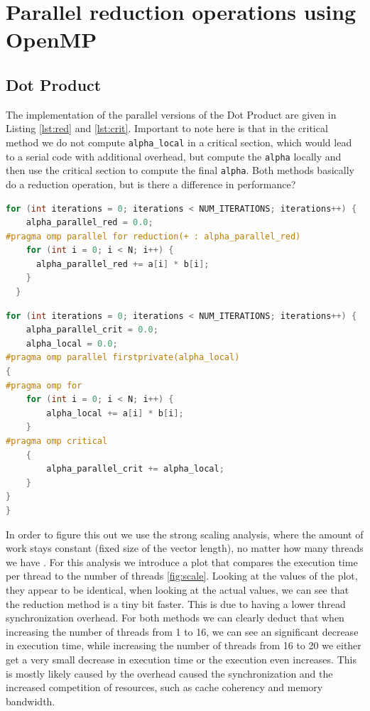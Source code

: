 \section{Parallel reduction operations using OpenMP}
\subsection{Dot Product}
The implementation of the parallel versions of the Dot Product are given in Listing \ref{lst:red} and \ref{lst:crit}.
Important to note here is that in the critical method we do not compute \texttt{alpha\_local} in a critical section, which would lead to a serial code with additional overhead, but compute the \texttt{alpha} locally and then use the critical section to compute the final \texttt{alpha}. Both methods basically do a reduction operation, but is there a difference in performance? \newline
\begin{minipage}{.48\textwidth}
\begin{lstlisting}[language=C++, caption=Reduction Method, label=lst:red]
  for (int iterations = 0; iterations < NUM_ITERATIONS; iterations++) {
    alpha_parallel_red = 0.0;
#pragma omp parallel for reduction(+ : alpha_parallel_red)
    for (int i = 0; i < N; i++) {
      alpha_parallel_red += a[i] * b[i];
    }
  }

\end{lstlisting}
\end{minipage}\hfill
\begin{minipage}{.48\textwidth}
\begin{lstlisting}[language=C++, caption=Critical Section Method, label=lst:crit]
for (int iterations = 0; iterations < NUM_ITERATIONS; iterations++) {
	alpha_parallel_crit = 0.0;
	alpha_local = 0.0;
#pragma omp parallel firstprivate(alpha_local)
{
#pragma omp for
	for (int i = 0; i < N; i++) {
		alpha_local += a[i] * b[i];
	}
#pragma omp critical
	{
		alpha_parallel_crit += alpha_local;
	}
}
}

\end{lstlisting}
\end{minipage} \newline
In order to figure this out we use the strong scaling analysis, where the amount of work stays constant (fixed size of the vector length), no matter how many threads we have \cite{hager_introduction_2010}.
For this analysis we introduce a plot that compares the execution time per thread to the number of threads \ref{fig:scale}. Looking at the values of the plot, they appear to be identical, when looking at the actual values, we can see that the reduction method is a tiny bit faster. This is due to having a lower thread synchronization overhead. For both methods we can clearly deduct that when increasing the number of threads from 1 to 16, we can see an significant decrease in execution time, while increasing the number of threads from 16 to 20 we either get a very small decrease in execution time or the execution even increases. This is mostly likely caused by the overhead caused the synchronization and the increased competition of resources, such as cache coherency and memory bandwidth.
